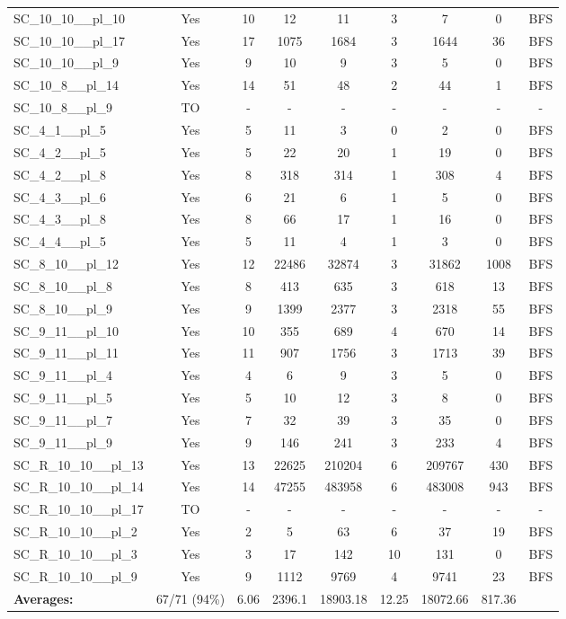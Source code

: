 \documentclass{article}
\begin{document}
\begin{tabular}{lcccccccc}
SC\_10\_10\_\_pl\_10 & Yes & 10 & 12 & 11 & 3 & 7 & 0 & BFS \\
SC\_10\_10\_\_pl\_17 & Yes & 17 & 1075 & 1684 & 3 & 1644 & 36 & BFS \\
SC\_10\_10\_\_pl\_9 & Yes & 9 & 10 & 9 & 3 & 5 & 0 & BFS \\
SC\_10\_8\_\_pl\_14 & Yes & 14 & 51 & 48 & 2 & 44 & 1 & BFS \\
SC\_10\_8\_\_pl\_9 & TO & - & - & - & - & - & - & - \\
SC\_4\_1\_\_pl\_5 & Yes & 5 & 11 & 3 & 0 & 2 & 0 & BFS \\
SC\_4\_2\_\_pl\_5 & Yes & 5 & 22 & 20 & 1 & 19 & 0 & BFS \\
SC\_4\_2\_\_pl\_8 & Yes & 8 & 318 & 314 & 1 & 308 & 4 & BFS \\
SC\_4\_3\_\_pl\_6 & Yes & 6 & 21 & 6 & 1 & 5 & 0 & BFS \\
SC\_4\_3\_\_pl\_8 & Yes & 8 & 66 & 17 & 1 & 16 & 0 & BFS \\
SC\_4\_4\_\_pl\_5 & Yes & 5 & 11 & 4 & 1 & 3 & 0 & BFS \\
SC\_8\_10\_\_pl\_12 & Yes & 12 & 22486 & 32874 & 3 & 31862 & 1008 & BFS \\
SC\_8\_10\_\_pl\_8 & Yes & 8 & 413 & 635 & 3 & 618 & 13 & BFS \\
SC\_8\_10\_\_pl\_9 & Yes & 9 & 1399 & 2377 & 3 & 2318 & 55 & BFS \\
SC\_9\_11\_\_pl\_10 & Yes & 10 & 355 & 689 & 4 & 670 & 14 & BFS \\
SC\_9\_11\_\_pl\_11 & Yes & 11 & 907 & 1756 & 3 & 1713 & 39 & BFS \\
SC\_9\_11\_\_pl\_4 & Yes & 4 & 6 & 9 & 3 & 5 & 0 & BFS \\
SC\_9\_11\_\_pl\_5 & Yes & 5 & 10 & 12 & 3 & 8 & 0 & BFS \\
SC\_9\_11\_\_pl\_7 & Yes & 7 & 32 & 39 & 3 & 35 & 0 & BFS \\
SC\_9\_11\_\_pl\_9 & Yes & 9 & 146 & 241 & 3 & 233 & 4 & BFS \\
SC\_R\_10\_10\_\_pl\_13 & Yes & 13 & 22625 & 210204 & 6 & 209767 & 430 & BFS \\
SC\_R\_10\_10\_\_pl\_14 & Yes & 14 & 47255 & 483958 & 6 & 483008 & 943 & BFS \\
SC\_R\_10\_10\_\_pl\_17 & TO & - & - & - & - & - & - & - \\
SC\_R\_10\_10\_\_pl\_2 & Yes & 2 & 5 & 63 & 6 & 37 & 19 & BFS \\
SC\_R\_10\_10\_\_pl\_3 & Yes & 3 & 17 & 142 & 10 & 131 & 0 & BFS \\
SC\_R\_10\_10\_\_pl\_9 & Yes & 9 & 1112 & 9769 & 4 & 9741 & 23 & BFS \\
\textbf{Averages:} & 67/71 (94\%) & 6.06 & 2396.1 & 18903.18 & 12.25 & 18072.66 & 817.36 & \\
\bottomrule
\end{tabular}
\\[0.7cm]
\end{document}
